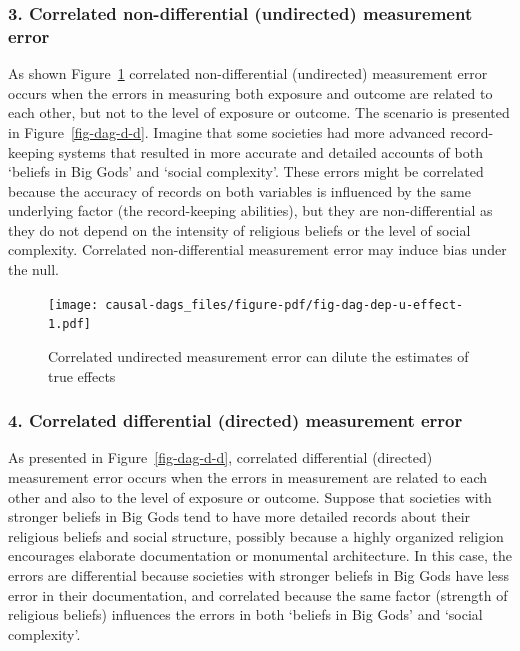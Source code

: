 \documentclass[
  singlecolumn]{report}
\begin{document}
\hypertarget{correlated-non-differential-undirected-measurement-error}{%
\subsubsection{\texorpdfstring{3. \textbf{Correlated non-differential
(undirected) measurement
error}}{3. Correlated non-differential (undirected) measurement error}}\label{correlated-non-differential-undirected-measurement-error}}

As shown Figure~\ref{fig-dag-dep-u-effect} correlated non-differential
(undirected) measurement error occurs when the errors in measuring both
exposure and outcome are related to each other, but not to the level of
exposure or outcome. The scenario is presented in
Figure~\ref{fig-dag-d-d}. Imagine that some societies had more advanced
record-keeping systems that resulted in more accurate and detailed
accounts of both `beliefs in Big Gods' and `social complexity'. These
errors might be correlated because the accuracy of records on both
variables is influenced by the same underlying factor (the
record-keeping abilities), but they are non-differential as they do not
depend on the intensity of religious beliefs or the level of social
complexity. Correlated non-differential measurement error may induce
bias under the null.

\begin{figure}

{\centering \texttt{[image: causal-dags\_files/figure-pdf/fig-dag-dep-u-effect-1.pdf]}

}

\caption{\label{fig-dag-dep-u-effect}Correlated undirected measurement
error can dilute the estimates of true effects}

\end{figure}

\hypertarget{correlated-differential-directed-measurement-error}{%
\subsubsection{\texorpdfstring{4. \textbf{Correlated differential
(directed) measurement
error}}{4. Correlated differential (directed) measurement error}}\label{correlated-differential-directed-measurement-error}}

As presented in Figure~\ref{fig-dag-d-d}, correlated differential
(directed) measurement error occurs when the errors in measurement are
related to each other and also to the level of exposure or outcome.
Suppose that societies with stronger beliefs in Big Gods tend to have
more detailed records about their religious beliefs and social
structure, possibly because a highly organized religion encourages
elaborate documentation or monumental architecture. In this case, the
errors are differential because societies with stronger beliefs in Big
Gods have less error in their documentation, and correlated because the
same factor (strength of religious beliefs) influences the errors in
both `beliefs in Big Gods' and `social complexity'.
\end{document}
